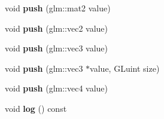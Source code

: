 \begin{DoxyCompactItemize}
void {\bfseries push} (glm\+::mat2 value)
\item 
\mbox{\label{classflw_1_1flc_1_1Uniform_a7d558b70ce0467fcd85e9cc0d47402c9}} 
void {\bfseries push} (glm\+::vec2 value)
\item 
\mbox{\label{classflw_1_1flc_1_1Uniform_a860fcb553a0917a1702d3ff825d73b79}} 
void {\bfseries push} (glm\+::vec3 value)
\item 
\mbox{\label{classflw_1_1flc_1_1Uniform_ace580c601b332825129e6ac9f7797d90}} 
void {\bfseries push} (glm\+::vec3 $\ast$value, G\+Luint size)
\item 
\mbox{\label{classflw_1_1flc_1_1Uniform_a344dd57159a88f4bc225c156e8ca4eca}} 
void {\bfseries push} (glm\+::vec4 value)
\item 
\mbox{\label{classflw_1_1flc_1_1Uniform_af53afa2da6c7e1ce57666f2c1d7d34aa}} 
void {\bfseries log} () const
\end{DoxyCompactItemize}
